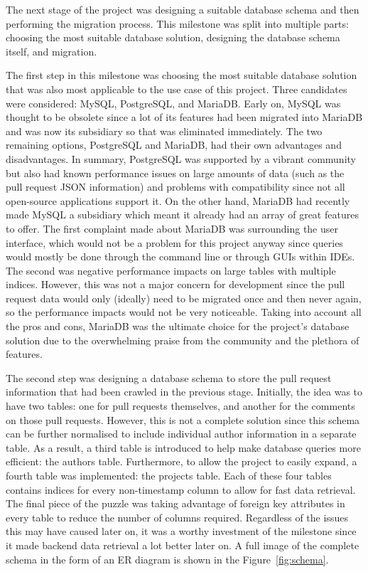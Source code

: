 The next stage of the project was designing a suitable database schema and then performing the migration process.
This milestone was split into multiple parts: choosing the most suitable database solution,
designing the database schema itself, and migration.

The first step in this milestone was choosing the most suitable database solution
that was also most applicable to the use case of this project.
Three candidates were considered: MySQL, PostgreSQL, and MariaDB\@.
Early on,
MySQL was thought
to be obsolete since a lot of its features had been migrated into MariaDB
and was now its subsidiary so that was eliminated immediately.
The two remaining options, PostgreSQL and MariaDB, had their own advantages and disadvantages.
In summary,
PostgreSQL was supported by a vibrant community
but also had known performance issues on large amounts of data
(such as the pull request JSON information)
and problems with compatibility since not all open-source applications support it.
On the other hand,
MariaDB had recently made MySQL a subsidiary which meant it already had an array of great features to offer.
The first complaint made about MariaDB was surrounding the user interface,
which would not be a problem for this project anyway
since queries would mostly be done through the command line or through GUIs within IDEs.
The second was negative performance impacts on large tables with multiple indices.
However, this was not a major concern for development since the pull request data would only
(ideally) need to be migrated once and then never again,
so the performance impacts would not be very noticeable.
Taking into account all the pros and cons, MariaDB was the ultimate choice for the project's database solution due to the overwhelming praise from the community and the plethora of features.

The second step was designing a database schema
to store the pull request information that had been crawled in the previous stage.
Initially, the idea was to have two tables: one for pull requests themselves,
and another for the comments on those pull requests.
However,
this is not a complete solution
since this schema can be further normalised to include individual author information in a separate table.
As a result, a third table is introduced to help make database queries more efficient: the authors table.
Furthermore,
to allow the project to easily expand,
a fourth table was implemented: the projects table.
Each of these four tables contains indices for every non-timestamp column to allow for fast data retrieval.
The final piece of the puzzle was taking advantage of foreign key attributes in every table
to reduce the number of columns required.
Regardless of the issues this may have caused later on,
it was a worthy investment of the milestone since it made backend data retrieval a lot better later on.
A full image of the complete schema in the form of an ER diagram is shown in the Figure~\ref{fig:schema}.

